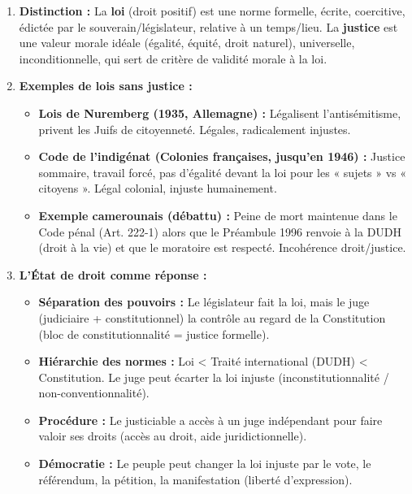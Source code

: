 \documentclass[11pt]{article}
\begin{document}
\begin{corrige}
\begin{enumerate}
    \item \textbf{Distinction :} La \textbf{loi} (droit positif) est une norme formelle, écrite, coercitive, édictée par le souverain/législateur, relative à un temps/lieu. La \textbf{justice} est une valeur morale idéale (égalité, équité, droit naturel), universelle, inconditionnelle, qui sert de critère de validité morale à la loi.
    \item \textbf{Exemples de lois sans justice :}
        \begin{itemize}
            \item \textbf{Lois de Nuremberg (1935, Allemagne) :} Légalisent l'antisémitisme, privent les Juifs de citoyenneté. Légales, radicalement injustes.
            \item \textbf{Code de l'indigénat (Colonies françaises, jusqu'en 1946) :} Justice sommaire, travail forcé, pas d'égalité devant la loi pour les « sujets » vs « citoyens ». Légal colonial, injuste humainement.
            \item \textbf{Exemple camerounais (débattu) :} Peine de mort maintenue dans le Code pénal (Art. 222-1) alors que le Préambule 1996 renvoie à la DUDH (droit à la vie) et que le moratoire est respecté. Incohérence droit/justice.
        \end{itemize}
    \item \textbf{L'État de droit comme réponse :}
        \begin{itemize}
            \item \textbf{Séparation des pouvoirs :} Le législateur fait la loi, mais le juge (judiciaire + constitutionnel) la contrôle au regard de la Constitution (bloc de constitutionnalité = justice formelle).
            \item \textbf{Hiérarchie des normes :} Loi < Traité international (DUDH) < Constitution. Le juge peut écarter la loi injuste (inconstitutionnalité / non-conventionnalité).
            \item \textbf{Procédure :} Le justiciable a accès à un juge indépendant pour faire valoir ses droits (accès au droit, aide juridictionnelle).
            \item \textbf{Démocratie :} Le peuple peut changer la loi injuste par le vote, le référendum, la pétition, la manifestation (liberté d'expression).
        \end{itemize}
\end{enumerate}
\end{corrige}
\end{document}
